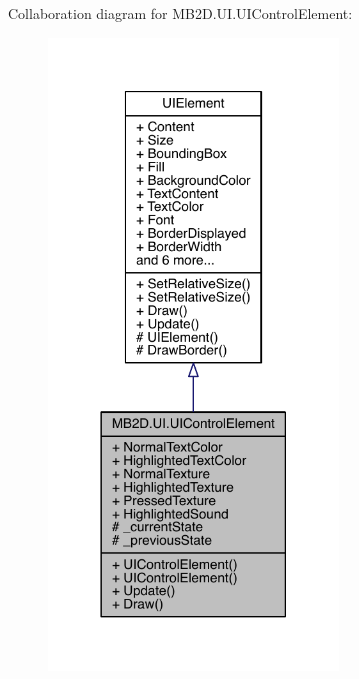 Collaboration diagram for M\+B2\+D.\+U\+I.\+U\+I\+Control\+Element\+:
\nopagebreak
\begin{figure}[H]
\begin{center}
\leavevmode
\includegraphics[width=218pt]{class_m_b2_d_1_1_u_i_1_1_u_i_control_element__coll__graph}
\end{center}
\end{figure}
